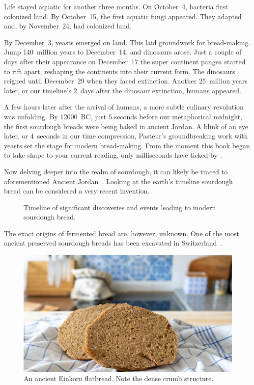 Life stayed aquatic for another three months.
On October~4, bacteria first colonized land. By October~15, the
first aquatic fungi appeared. They adapted and, by November~24, had colonized
land.

By December~3, yeasts emerged on land. This laid groundwork for bread-making.
Jump 140~million years to December~14, and dinosaurs arose. Just a couple
of days after their appearance on December~17 the super continent pangea
started to rift apart, reshaping the continents into their current form.
The dinosaurs reigned until December~29 when they faced extinction.
Another 25~million years later, or our timeline's 2~days after the dinosaur
extinction, humans appeared.

A few hours later after the arrival of humans, a more subtle culinary
revolution was unfolding. By \num{12000}~BC, just 5 seconds before our metaphorical
midnight, the first sourdough breads were being baked in ancient Jordan. A blink of
an eye later, or 4~seconds in our time compression, Pasteur's groundbreaking work
with yeasts set the stage for modern bread-making. From the moment this book
began to take shape to your current reading, only milliseconds have ticked by~\cite{Yong+2017}.

Now delving deeper into the realm of sourdough, it can likely be traced to aforementioned
Ancient Jordan~\cite{jordan+bread}. Looking at the earth's timeline sourdough
bread can be considered a very recent invention.

\begin{figure}[!htb]
\begin{center}
  
  \caption[Sourdough history timeline]{Timeline of significant discoveries and events
    leading to modern sourdough bread.}%
\end{center}
\end{figure}

The exact origins of fermented
bread are, however, unknown. One of the most ancient preserved
sourdough breads has been excavated in Switzerland~\cite{switzerland+bread}.

\begin{figure}[ht]
  \includegraphics[width=\textwidth]{einkorn-crumb}
  \caption[Ancient Einkorn flatbread]{An ancient Einkorn flatbread. Note the
      dense crumb structure.}%
  \label{einkorn-crumb}
\end{figure}

